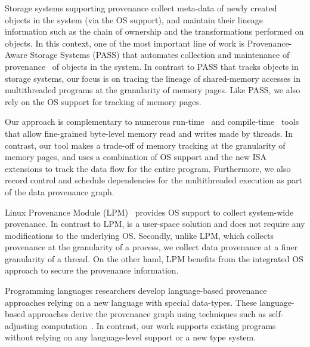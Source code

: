 

 Storage systems supporting provenance collect meta-data of newly created objects in the system (via the OS support), 
and  maintain their lineage information such as the chain of ownership and the transformations performed on objects. In this context, one of the most important line of work is Provenance-Aware Storage Systems (PASS) that automates collection and maintenance of provenance~\cite{pass-atc} of objects in the system. 
In contrast to PASS that tracks objects in storage systems, our focus is on tracing the lineage of shared-memory accesses in multithreaded programs at the granularity of memory pages. Like PASS, we also rely on the OS support for tracking of memory pages.


 Our approach is complementary to numerous run-time~\cite{memtrace} and compile-time~\cite{cgo-compiler-provenance} tools that allow fine-grained byte-level memory read and writes made by threads. In contrast, our tool makes a trade-off of memory tracking at the granularity of memory pages, and uses a combination of OS support and the new ISA extensions to track the data flow for the entire program. Furthermore, we also record control and schedule dependencies for the multithreaded execution as part of the data provenance graph. 


 Linux Provenance Module (LPM)~\cite{lpm} provides OS support to collect system-wide provenance. In contrast to LPM, \projecttitle is a user-space solution and does not require any modifications to the underlying OS. Secondly, unlike LPM, which collects provenance at the granularity of a process, we collect data provenance at a finer granularity of a thread.  On the other hand, LPM benefits from the integrated OS approach to secure the provenance information. 

 Programming languages researchers develop language-based provenance approaches relying on a new language with special data-types. These language-based approaches derive the provenance graph using techniques such as self-adjusting computation~\cite{Acar05}. In contrast, our work supports existing programs without relying on any language-level support or a new type system.




